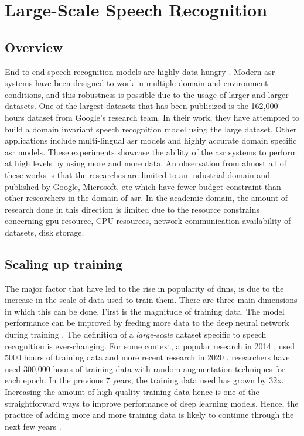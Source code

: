 \chapter{Large-Scale Speech Recognition}
\label{chapter:largescale}

\section{Overview}
End to end speech recognition models are highly data hungry \cite{Li2020OnRecognition}. Modern \acrshort{asr} systems have been designed to work in multiple domain and environment conditions, and this robustness is possible due to the usage of larger and larger datasets. One of the largest datasets that has been publicized is the 162,000 hours dataset from Google's research team. In their work, they have attempted to build a domain invariant speech recognition model using the large dataset\cite{Narayanan2019TowardTraining}. Other applications include multi-lingual \acrshort{asr} models \cite{Kannan2019Large-ScaleModel} and highly accurate domain specific \acrshort{asr} models. These experiments showcase the ability of the \acrshort{asr} systems to perform at high levels by using more and more data. An observation from almost all of these works is that the researches are limited to an industrial domain and published by Google, Microsoft, etc which have fewer budget constraint than other researchers in the domain of \acrshort{asr}. In the academic domain, the amount of research done in this direction is limited due to the resource constrains concerning \acrshort{gpu} resource, CPU resources, network communication availability of datasets, disk storage. 

\section{Scaling up training}
The major factor that have led to the rise in popularity of \acrshort{dnn}s, is due to the increase in the scale of data used to train them. There are three main dimensions in which this can be done. First is the magnitude of training data. The model performance can be improved by feeding more data to the deep neural network during training \cite{Hestness2017DEEPEMPIRICALLY}. The definition of a \emph{large-scale} dataset specific to speech recognition is ever-changing. For some context, a popular research in 2014 \cite{Hannun2014DeepRecognition}, used 5000 hours of training data and more recent research in 2020 \cite{Narayanan2019RECOGNIZINGMODELS}, researchers have used 300,000 hours of training data with random augmentation techniques for each epoch. In the previous 7 years, the training data used has grown by 32x. Increasing the amount of high-quality training data hence is one of the straightforward ways to improve performance of deep learning models. Hence, the practice of adding more and more training data is likely to continue through the next few years \cite{Mayer2020ScalableInfrastructures}. 


